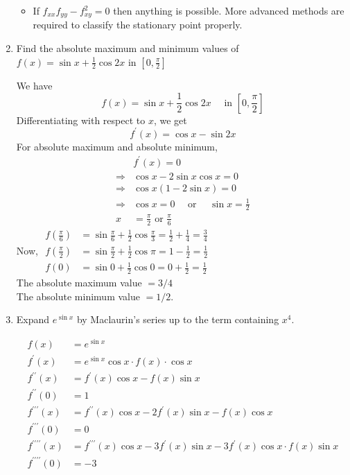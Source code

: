 \begin{enumerate}
\begin{answer}
\begin{note}
\begin{itemize}
				\item  If $f_{x x} f_{y y}-f_{x y}^{2}=0$ then anything is possible. More advanced methods are required to classify the stationary point properly.
			\end{itemize}
		\end{note}
	\end{answer}
	\item Find the absolute maximum and minimum values of $f(x)=\sin x+\frac{1}{2} \cos 2 x$ in $\left[0, \frac{\pi}{2}\right]$
	\begin{answer}
		We have
		$$
		f(x)=\sin x+\frac{1}{2} \cos 2 x \quad \text { in }\left[0, \frac{\pi}{2}\right]
		$$
		Differentiating with respect to $x$, we get
		$$
		f^{\prime}(x)=\cos x-\sin 2 x
		$$
		For absolute maximum and absolute minimum,
		$$
		\begin{aligned}
		& f^{\prime}(x)=0 \\
		\Rightarrow & \cos x-2 \sin x \cos x=0 \\
		\Rightarrow & \cos x(1-2 \sin x)=0 \\
		\Rightarrow & \cos x=0 \quad \text { or } \quad \sin x=\frac{1}{2} \\
		x &=\frac{\pi}{2} \text { or } \frac{\pi}{6}
		\end{aligned}
		$$
		Now, $\begin{aligned} f\left(\frac{\pi}{6}\right) &=\sin \frac{\pi}{6}+\frac{1}{2} \cos \frac{\pi}{3}=\frac{1}{2}+\frac{1}{4}=\frac{3}{4} \\ f\left(\frac{\pi}{2}\right) &=\sin \frac{\pi}{2}+\frac{1}{2} \cos \pi=1-\frac{1}{2}=\frac{1}{2} \\ f(0) &=\sin 0+\frac{1}{2} \cos 0=0+\frac{1}{2}=\frac{1}{2} \end{aligned}$
		\\The absolute maximum value $=3 / 4$
		\\The absolute minimum value $=1 / 2$.
	\end{answer}
	\item Expand $e^{\sin x}$ by Maclaurin's series up to the term containing $x^{4}$.
	\begin{answer}
		
		\begin{align*}
		f(x)&= e^{\sin x} \\
		f^{\prime}(x)&= e^{\sin x} \cos x \cdot f(x) \cdot \cos x \\
		f^{\prime \prime}(x)&= f^{\prime}(x) \cos x-f(x) \sin x \\ f^{\prime \prime}(0)&=1 \\
		f^{\prime \prime \prime}(x)&= f^{\prime \prime}(x) \cos x-2 f^{\prime}(x) \sin x 
		-f(x) \cos x\\ f^{\prime \prime \prime}(0)&=0 \\
		f^{\prime \prime \prime \prime}(x)&= f^{\prime \prime \prime}(x) \cos x-3 f^{\prime}(x) \sin x 
		-3 f^{\prime}(x) \cos x \cdot f(x) \sin x  \\
		f^{\prime \prime \prime \prime}(0)&=-3
		\end{align*}
		

\end{answer}
\end{enumerate}
